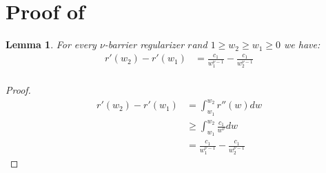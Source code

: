 \documentclass[10pt]{article}
\newif\ifopt
\newcommand{\opt}[1]{\ifopt #1\fi}
\newtheorem{lemma}[theorem]{Lemma}
\theoremstyle{definition}
\theoremstyle{remark}
\newcommand{\barconst}{\nu}
\begin{document}
\opt{
\paragraph{Implications for the main theorems.}
\begin{itemize}
    \item \textit{\Cref{thm:up_barrier_adversarial}.}  
    Any adversarial sequence over the simplex is $T$-balanced: if one coordinate exceeds the best by more than $T$, it must actually be the best. 
    Applying \Cref{lem:balance upper bound} with $\alpha=T$ gives the desired upper bound. 

    \item \textit{\Cref{thm:ub_barrier_stochastic}.}  
    For i.i.d.\ losses, Hoeffding's inequality and union bounds implies that with probability at least $1-\delta$, the balance is at most $O(\sqrt{T\log(dT^2/\delta)})$. 
    Plugging this value of $\alpha$ into \Cref{lem:balance upper bound} yields the stochastic upper bound.
\end{itemize}

}

\section{Proof of }\label{sec:polytope upper bound}
\begin{lemma}\label{lem:gradient_diff}
For every $\barconst$-barrier regularizer $r$and $1 \ge w_2 \ge w_1 \ge 0$ we have:
\begin{align*}
    r'(w_2) - r'(w_1) 
    &= \frac{c_1}{w_1^{\barconst-1}} - \frac{c_1}{w_2^{\barconst-1}} \\
\end{align*}
\end{lemma}
\begin{proof}
\begin{align*}
    r'(w_2) - r'(w_1) &= \int_{w_1}^{w_2} r''(w)dw \\
    &\ge \int_{w_1}^{w_2}\frac{c_1}{w^\barconst}dw \\
    &= \frac{c_1}{w_1^{\barconst-1}} - \frac{c_1}{w_2^{\barconst-1}} 
\end{align*}
\end{proof}
\end{document}
